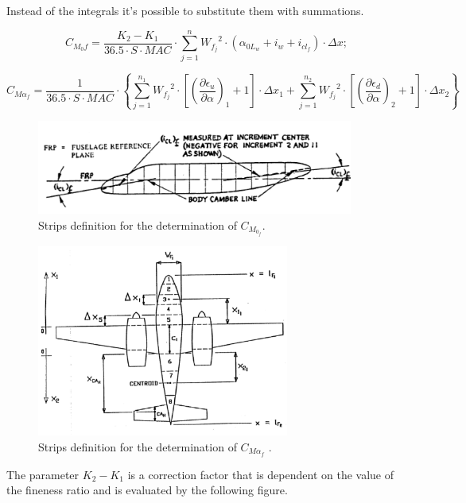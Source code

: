 Instead of the integrals it’s possible to substitute them with summations.

\begin{equation}
C_{M_{0}f}=\dfrac{K_2-K_1}{36.5\cdot S\cdot MAC}\cdot\sum_{j=1}^{n} \! {W_{f_j}}^2\cdot\left(\alpha_{{0L}_w}+i_w+i_{{cl}_f}\right)\cdot \Delta x;
\end{equation}

\begin{equation}
C_{{M\alpha}_f}=\dfrac{1}{36.5\cdot S\cdot MAC}\cdot \left\{ \sum_{j=1}^{n_1} \! {W_{f_j}}^2\cdot \left[ {\left( \dfrac{\partial \epsilon_u}{\partial \alpha} \right)}_1 +1\right] \cdot \Delta x_{1} + \sum_{j=1}^{n_2} \! {W_{f_j}}^2\cdot \left[ {\left( \dfrac{\partial \epsilon_d}{\partial \alpha} \right)}_2 +1\right] \cdot \Delta x_{2} \right\}
\end{equation}


\begin{figure}[H]
\centering
\includegraphics[height=3.1cm]{Immagini/stripszero}
\caption{Strips definition for the determination of $C_{M_{0_f}}$.}
\label{wing}
\end{figure}

\begin{figure}[H]
\centering
\includegraphics[height=6.3cm]{Immagini/stripsalfa}
\caption{Strips definition for the determination of $C_{{M\alpha}_f}$ .}
\label{wing}
\end{figure}


The parameter $K_2-K_1$ is a correction factor that is dependent on the value of the fineness ratio and is evaluated by the following figure.\cite{adas}


